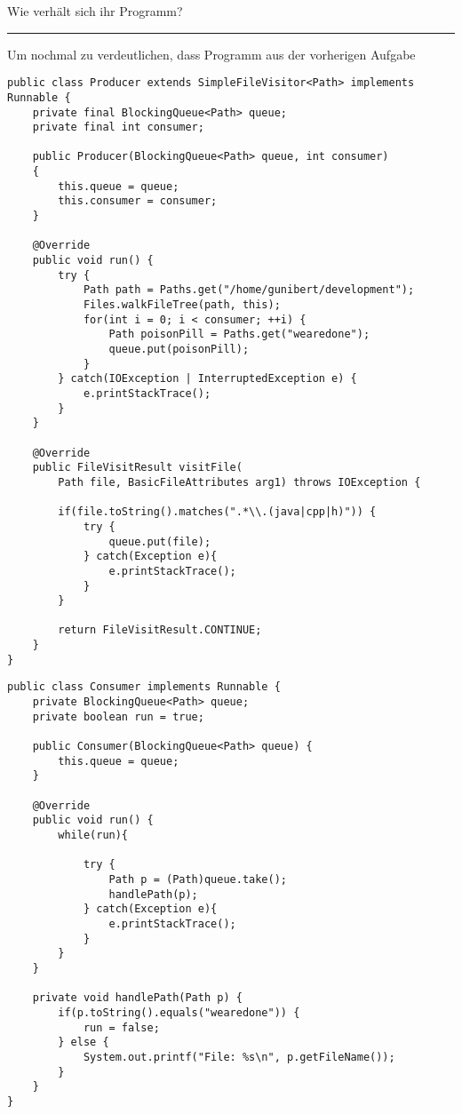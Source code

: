 Wie verhält sich ihr Programm?

\begin{center}\rule{0.5\linewidth}{\linethickness}\end{center}

Um nochmal zu verdeutlichen, dass Programm aus der vorherigen Aufgabe

\begin{verbatim}
public class Producer extends SimpleFileVisitor<Path> implements Runnable {
    private final BlockingQueue<Path> queue;
    private final int consumer;

    public Producer(BlockingQueue<Path> queue, int consumer)
    {
        this.queue = queue;
        this.consumer = consumer;
    }

    @Override
    public void run() {
        try {
            Path path = Paths.get("/home/gunibert/development");
            Files.walkFileTree(path, this);
            for(int i = 0; i < consumer; ++i) {
                Path poisonPill = Paths.get("wearedone");
                queue.put(poisonPill);
            }
        } catch(IOException | InterruptedException e) {
            e.printStackTrace();
        }
    }

    @Override
    public FileVisitResult visitFile(
        Path file, BasicFileAttributes arg1) throws IOException {

        if(file.toString().matches(".*\\.(java|cpp|h)")) {
            try {
                queue.put(file);
            } catch(Exception e){
                e.printStackTrace();
            }
        }

        return FileVisitResult.CONTINUE;
    }
}
\end{verbatim}

\begin{verbatim}
public class Consumer implements Runnable {
    private BlockingQueue<Path> queue;
    private boolean run = true;

    public Consumer(BlockingQueue<Path> queue) {
        this.queue = queue;
    }

    @Override
    public void run() {
        while(run){
            
            try {
                Path p = (Path)queue.take();
                handlePath(p);
            } catch(Exception e){
                e.printStackTrace();
            }
        }
    }

    private void handlePath(Path p) {
        if(p.toString().equals("wearedone")) {
            run = false;
        } else {
            System.out.printf("File: %s\n", p.getFileName());
        }
    }
}
\end{verbatim}

